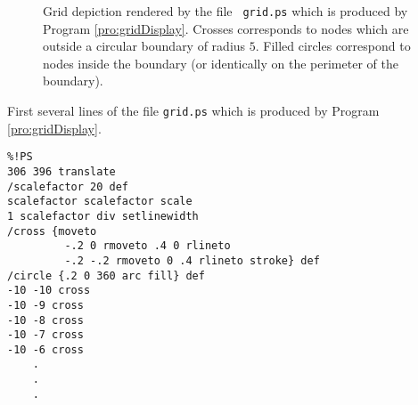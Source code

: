 \begin{figure}
  \begin{center}
  \end{center} \caption{Grid depiction rendered by the file {\tt
  grid.ps} which is produced by Program
  \ref{pro:gridDisplay}.  Crosses corresponds to nodes which are outside
  a circular boundary of radius $5$.  Filled circles correspond to
  nodes inside the boundary (or identically on the perimeter of the
  boundary).}
  \label{fig:gridDisplay}
\end{figure}

\begin{fragment}
First several lines of the file {\tt grid.ps} which is produced by
Program \ref{pro:gridDisplay}.
\label{frag:gridDisplay}
\codemiddle
\begin{verbatim}
%!PS
306 396 translate
/scalefactor 20 def
scalefactor scalefactor scale
1 scalefactor div setlinewidth
/cross {moveto
         -.2 0 rmoveto .4 0 rlineto
         -.2 -.2 rmoveto 0 .4 rlineto stroke} def
/circle {.2 0 360 arc fill} def
-10 -10 cross
-10 -9 cross
-10 -8 cross
-10 -7 cross
-10 -6 cross
    .
    .
    .
\end{verbatim}
\end{fragment}
